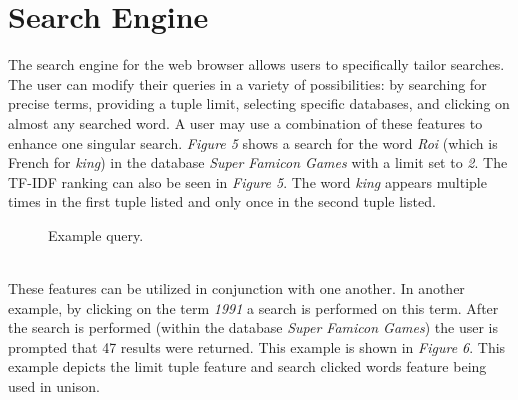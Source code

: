 \documentclass{sig-alternate-05-2015}
\begin{document}
\section{Search Engine}
The search engine for the web browser allows users to specifically tailor searches. The user can modify their queries in a variety of possibilities: by searching for precise terms, providing a tuple limit, selecting specific databases, and clicking on almost any searched word. A user may use a combination of these features to enhance one singular search. \textit{Figure 5} shows a search for the word \textit{Roi} (which is French for \textit{king}) in the database \textit{Super Famicon Games} with a limit set to \textit{2}. The TF-IDF ranking can also be seen in \textit{Figure 5}. The word \textit{king} appears multiple times in the first tuple listed and only once in the second tuple listed. 
 ~
\begin{figure}[h]
\center
{}
\caption{Example query.}
\center
\end{figure}
~
\\
These features can be utilized in conjunction with one another. In another example, by clicking on the term \textit{1991} a search is performed on this term. After the search is performed (within the database \textit{Super Famicon Games}) the user is prompted that 47 results were returned. This example is shown in \textit{Figure 6}. This example depicts the limit tuple feature and search clicked words feature being used in unison. 
\end{document}
